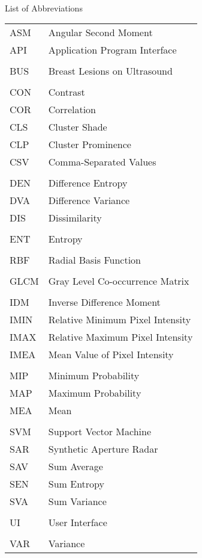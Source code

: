 

\renewcommand{\baselinestretch}{1}
\small\normalsize
\hbox{\ }

\vspace{-4em}

\begin{center}
\large{List of Abbreviations}
\end{center} 

\vspace{3pt}

\begin{supertabular}{ll}
ASM & Angular Second Moment \\
API & Application Program Interface\\
\\
BUS & Breast Lesions on Ultrasound \\
\\
CON & Contrast \\
COR & Correlation \\
CLS & Cluster Shade \\
CLP & Cluster Prominence \\
CSV & Comma-Separated Values\\
\\
DEN & Difference Entropy \\
DVA & Difference Variance \\
DIS & Dissimilarity \\

\\
ENT & Entropy \\
\\
RBF & Radial Basis Function \\
\\
GLCM & Gray Level Co-occurrence Matrix\\
\\
IDM & Inverse Difference Moment \\
IMIN & Relative Minimum Pixel Intensity\\
IMAX & Relative Maximum Pixel Intensity\\
IMEA & Mean Value of Pixel Intensity\\
\\
MIP & Minimum Probability \\
MAP & Maximum Probability \\
MEA & Mean \\
\\
SVM & Support Vector Machine \\
SAR & Synthetic Aperture Radar\\
SAV & Sum Average \\
SEN & Sum Entropy \\
SVA & Sum Variance \\
\\
UI & User Interface \\
\\
VAR & Variance \\

\end{supertabular}

